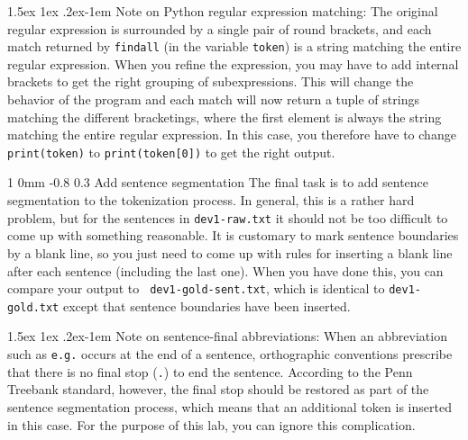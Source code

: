 \documentclass[11pt]{article}
\makeatletter
\newcommand{\newsec}[2]{\section{#1}\label{sec:#2}\noindent}
\renewcommand{\section}{\@startsection
{section}%
{1}%
{0mm}%
{-0.8\baselineskip}%
{0.3\baselineskip}%
{\bfseries\large}}%
\renewcommand{\paragraph}{%
  \@startsection{paragraph}{4}%
  {\z@}{1.5ex \@plus 1ex \@minus .2ex}{-1em}%
  {\normalfont\normalsize\bfseries}%
}\makeatother
\makeatother
\begin{document}
\paragraph{Note on Python regular expression matching:} The original
regular expression is surrounded by a single pair of round brackets,
and each match returned by {\tt findall} (in the variable {\tt token})
is a string matching the entire regular expression. When you refine
the expression, you may have to add internal brackets to get the right
grouping of subexpressions. This will change the behavior of the
program and each match will now return a tuple of strings matching the
different bracketings, where the first element is always the string
matching the entire regular expression. In this case, you therefore
have to change {\tt print(token)} to {\tt print(token[0])} to get the
right output.
 
\newsec{Add sentence segmentation }{sent}%
The final task is to add sentence segmentation to the tokenization
process. In general, this is a rather hard problem, but for the
sentences in {\tt dev1-raw.txt} it should not be too difficult to come
up with something reasonable. It is customary to mark sentence
boundaries by a blank line, so you just need to come up with rules for
inserting a blank line after each sentence (including the last
one). When you have done this, you can compare your output to {\tt
  dev1-gold-sent.txt}, which is identical to {\tt dev1-gold.txt}
except that sentence boundaries have been inserted.

\paragraph{Note on sentence-final abbreviations:} When an abbreviation
such as {\tt e.g.} occurs at the end of a sentence, orthographic
conventions prescribe that there is no final stop ({\tt .}) to end the
sentence. According to the Penn Treebank standard, however, the final
stop should be restored as part of the sentence segmentation process,
which means that an additional token is inserted in this case. For the
purpose of this lab, you can ignore this complication.

\end{document}
